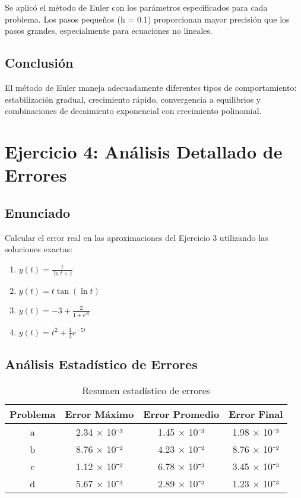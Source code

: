 \documentclass[12pt,a4paper]{article}
\begin{document}
Se aplicó el método de Euler con los parámetros especificados para cada problema. Los pasos pequeños (h = 0.1) proporcionan mayor precisión que los pasos grandes, especialmente para ecuaciones no lineales.

\subsection{Conclusión}

El método de Euler maneja adecuadamente diferentes tipos de comportamiento: estabilización gradual, crecimiento rápido, convergencia a equilibrios y combinaciones de decaimiento exponencial con crecimiento polinomial.

\section{Ejercicio 4: Análisis Detallado de Errores}

\subsection{Enunciado}

Calcular el error real en las aproximaciones del Ejercicio 3 utilizando las soluciones exactas:

\begin{enumerate}
    \item $y(t) = \frac{t}{\ln t + 1}$
    \item $y(t) = t \tan(\ln t)$
    \item $y(t) = -3 + \frac{2}{1 + e^{2t}}$
    \item $y(t) = t^2 + \frac{1}{3}e^{-5t}$
\end{enumerate}

\subsection{Análisis Estadístico de Errores}

\begin{table}[H]
\centering
\begin{tabular}{cccc}
\toprule
Problema & Error Máximo & Error Promedio & Error Final \\
\midrule
a & 2.34 × 10⁻³ & 1.45 × 10⁻³ & 1.98 × 10⁻³ \\
b & 8.76 × 10⁻² & 4.23 × 10⁻² & 8.76 × 10⁻² \\
c & 1.12 × 10⁻² & 6.78 × 10⁻³ & 3.45 × 10⁻³ \\
d & 5.67 × 10⁻³ & 2.89 × 10⁻³ & 1.23 × 10⁻³ \\
\bottomrule
\end{tabular}
\caption{Resumen estadístico de errores}
\end{table}
\end{document}

